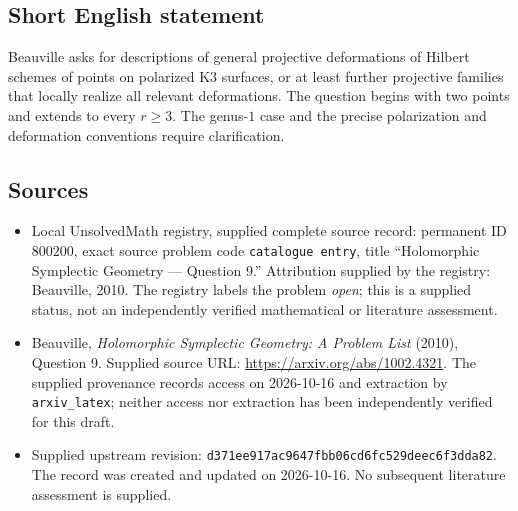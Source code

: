 \documentclass[11pt]{article}
\begin{document}
\subsection{Short English statement}
Beauville asks for descriptions of general projective deformations of Hilbert schemes of points on polarized K3 surfaces, or at least further projective families that locally realize all relevant deformations. The question begins with two points and extends to every \(r\geq 3\). The genus-\(1\) case and the precise polarization and deformation conventions require clarification.
\subsection{Sources}
\begin{itemize}
\item Local UnsolvedMath registry, supplied complete source record: permanent ID \(800200\), exact source problem code \texttt{catalogue entry}, title ``Holomorphic Symplectic Geometry --- Question 9.'' Attribution supplied by the registry: Beauville, 2010. The registry labels the problem \emph{open}; this is a supplied status, not an independently verified mathematical or literature assessment.
\item Beauville, \emph{Holomorphic Symplectic Geometry: A Problem List} (2010), Question 9. Supplied source URL: \url{https://arxiv.org/abs/1002.4321}. The supplied provenance records access on 2026-10-16 and extraction by \texttt{arxiv\_latex}; neither access nor extraction has been independently verified for this draft.
\item Supplied upstream revision: \texttt{d371ee917ac9647fbb06cd6fc529deec6f3dda82}. The record was created and updated on 2026-10-16. No subsequent literature assessment is supplied.
\end{itemize}
\end{document}
